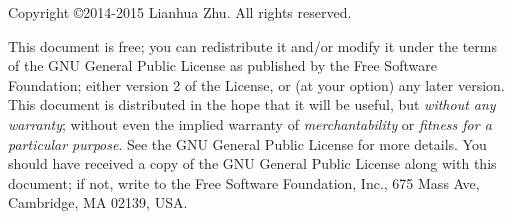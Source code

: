 \begin{small}
  \noindent Copyright \copyright 2014-2015 Lianhua Zhu.  All rights reserved.

  This document is free; you can redistribute it and/or modify it
  under the terms of the GNU General Public License as published by
  the Free Software Foundation; either version 2 of the License, or
  (at your option) any later version.
  This document is distributed in the hope that it will be useful, but
  \emph{without any warranty}; without even the implied warranty of
  \emph{merchantability} or \emph{fitness for a particular purpose}\@.  See the GNU
  General Public License for more details.
  You should have received a copy of the GNU General Public License
  along with this document; if not, write to the Free Software
  Foundation, Inc., 675 Mass Ave, Cambridge, MA 02139, USA.
\end{small}


\pagebreak
\endinput
%

